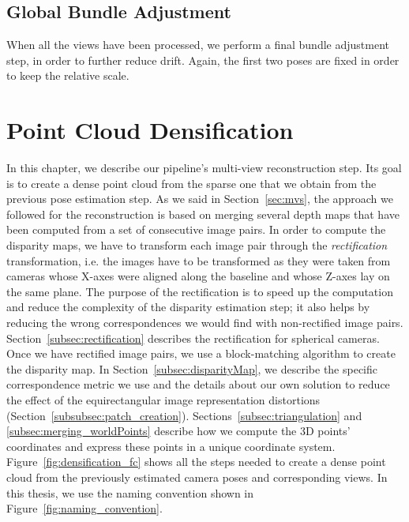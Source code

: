 \subsection{Global Bundle Adjustment}
When all the views have been processed, we perform a final bundle adjustment 
step, in order to further reduce drift. Again, the first two poses are fixed in 
order to keep the relative scale.

\section{Point Cloud Densification}
\label{sec:pipeline_densification}
In this chapter, we describe our pipeline's multi-view reconstruction step.
Its goal is to create a dense point cloud from the sparse one that we obtain
from the previous pose estimation step.
As we said in Section~\ref{sec:mvs}, the approach we followed for the
reconstruction is based on merging several depth maps that have been computed
from a set of consecutive image pairs.
In order to compute the disparity maps, we have to transform each image pair
through the \emph{rectification} transformation, i.e. the images have to be
transformed as they were taken from cameras whose X-axes were aligned along the
baseline and whose Z-axes lay on the same plane.
The purpose of the rectification is to speed up the computation and reduce the 
complexity of the disparity estimation step; it also helps by
reducing the wrong correspondences we would find with
non-rectified image pairs. Section~\ref{subsec:rectification} describes the
rectification for spherical cameras.
Once we have rectified image pairs, we use a block-matching algorithm to create
the disparity map. In Section~\ref{subsec:disparityMap}, we describe
the specific correspondence metric we use and the details about our own
solution to reduce the effect of the equirectangular image representation distortions
(Section~\ref{subsubsec:patch_creation}).
Sections~\ref{subsec:triangulation} and \ref{subsec:merging_worldPoints}
describe how we compute the 3D points' coordinates and express these points in
a unique coordinate system.
Figure~\ref{fig:densification_fc} shows all the steps needed to
create a dense point cloud from the previously estimated camera poses and
corresponding views.
In this thesis, we use the naming convention shown in
Figure~\ref{fig:naming_convention}.

